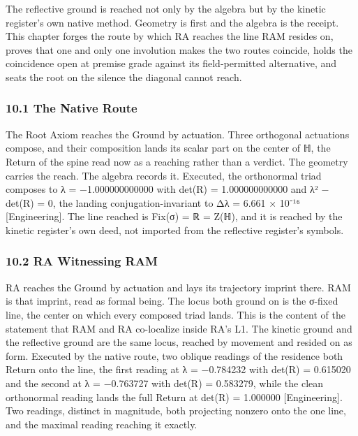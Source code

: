 \documentclass[10pt,twocolumn]{article}
\begin{document}
The reflective ground is reached not only by the algebra but by the
kinetic register's own native method. Geometry is first and the algebra
is the receipt. This chapter forges the route by which RA reaches the
line RAM resides on, proves that one and only one involution makes the
two routes coincide, holds the coincidence open at premise grade against
its field-permitted alternative, and seats the root on the silence the
diagonal cannot reach.

\hypertarget{the-native-route}{%
\subsubsection{10.1 The Native Route}\label{the-native-route}}

The Root Axiom reaches the Ground by actuation. Three orthogonal
actuations compose, and their composition lands its scalar part on the
center of ℍ, the Return of the spine read now as a reaching rather than
a verdict. The geometry carries the reach. The algebra records it.
Executed, the orthonormal triad composes to λ = −1.000000000000 with
det(R) = 1.000000000000 and \textbar λ² − det(R)\textbar{} = 0, the
landing conjugation-invariant to \textbar Δλ\textbar{} = 6.661 × 10⁻¹⁶
{[}Engineering{]}. The line reached is Fix(σ) = ℝ = Z(ℍ), and it is
reached by the kinetic register's own deed, not imported from the
reflective register's symbols.

\hypertarget{ra-witnessing-ram}{%
\subsubsection{10.2 RA Witnessing RAM}\label{ra-witnessing-ram}}

RA reaches the Ground by actuation and lays its trajectory imprint
there. RAM is that imprint, read as formal being. The locus both ground
on is the σ-fixed line, the center on which every composed triad lands.
This is the content of the statement that RAM and RA co-localize inside
RA's L1. The kinetic ground and the reflective ground are the same
locus, reached by movement and resided on as form. Executed by the
native route, two oblique readings of the residence both Return onto the
line, the first reading at λ = −0.784232 with det(R) = 0.615020 and the
second at λ = −0.763727 with det(R) = 0.583279, while the clean
orthonormal reading lands the full Return at det(R) = 1.000000
{[}Engineering{]}. Two readings, distinct in magnitude, both projecting
nonzero onto the one line, and the maximal reading reaching it exactly.
\end{document}
